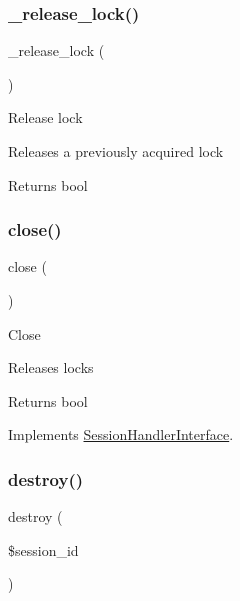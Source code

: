 \subsubsection{\texorpdfstring{\+\_\+release\+\_\+lock()}{\_release\_lock()}}
{\footnotesize\ttfamily \+\_\+release\+\_\+lock (\begin{DoxyParamCaption}{ }\end{DoxyParamCaption})\hspace{0.3cm}{\ttfamily [protected]}}

Release lock

Releases a previously acquired lock

\begin{DoxyReturn}{Returns}
bool 
\end{DoxyReturn}
\mbox{\label{class_c_i___session__database__driver_aa69c8bf1f1dcf4e72552efff1fe3e87e}} 
\subsubsection{\texorpdfstring{close()}{close()}}
{\footnotesize\ttfamily close (\begin{DoxyParamCaption}{ }\end{DoxyParamCaption})}

Close

Releases locks

\begin{DoxyReturn}{Returns}
bool 
\end{DoxyReturn}


Implements \mbox{\hyperlink{interface_session_handler_interface_aa69c8bf1f1dcf4e72552efff1fe3e87e}{Session\+Handler\+Interface}}.

\mbox{\label{class_c_i___session__database__driver_aaec5812f6b4eb6835f88d3baa06a002a}} 
\subsubsection{\texorpdfstring{destroy()}{destroy()}}
{\footnotesize\ttfamily destroy (\begin{DoxyParamCaption}\item[{}]{\$session\+\_\+id }\end{DoxyParamCaption})}

